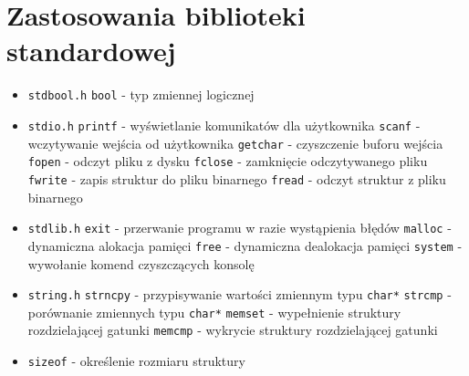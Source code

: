 \documentclass[a4paper, 12pt]{article}
\begin{document}
\section*{Zastosowania biblioteki standardowej}
\begin{itemize}
    \item \texttt{stdbool.h}
        \subitem \texttt{bool} - typ zmiennej logicznej
    \item \texttt{stdio.h}
        \subitem \texttt{printf} - wyświetlanie komunikatów dla użytkownika
        \subitem \texttt{scanf} - wczytywanie wejścia od użytkownika
        \subitem \texttt{getchar} - czyszczenie buforu wejścia
        \subitem \texttt{fopen} - odczyt pliku z dysku
        \subitem \texttt{fclose} - zamknięcie odczytywanego pliku
        \subitem \texttt{fwrite} - zapis struktur do pliku binarnego
        \subitem \texttt{fread} - odczyt struktur z pliku binarnego
    \item \texttt{stdlib.h}
        \subitem \texttt{exit} - przerwanie programu w razie wystąpienia błędów
        \subitem \texttt{malloc} - dynamiczna alokacja pamięci
        \subitem \texttt{free} - dynamiczna dealokacja pamięci
        \subitem \texttt{system} - wywołanie komend czyszczących konsolę
    \item \texttt{string.h}
        \subitem \texttt{strncpy} - przypisywanie wartości zmiennym typu \texttt{char*}
        \subitem \texttt{strcmp} - porównanie zmiennych typu \texttt{char*}
        \subitem \texttt{memset} - wypełnienie struktury rozdzielającej gatunki
        \subitem \texttt{memcmp} - wykrycie struktury rozdzielającej gatunki
    \item \texttt{sizeof} - określenie rozmiaru struktury
\end{itemize}
\end{document}
